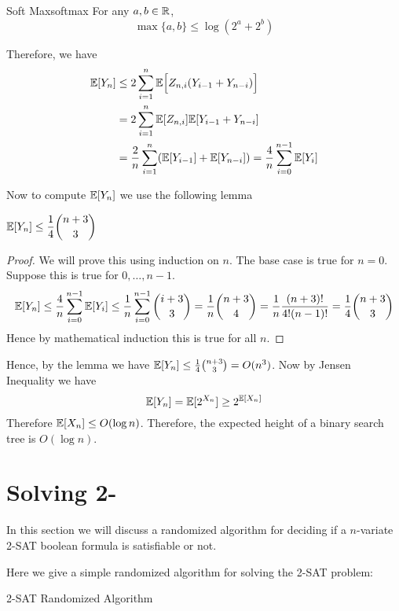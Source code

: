 \begin{lemma}{Soft Max}{softmax}
	For any $a,b\in \mathbb{R}$, $$\max\{a,b\}\leq \log (2^a+2^b)$$
\end{lemma}


Therefore, we have \begin{align*}
	\mathbb{E}[Y_n] & \leq 2\sum\limits_{i=1}^n\mathbb{E}\Big[Z_{n,i}(Y_{i-1}+ Y_{n-i})\Big]\\
	& = 2\sum\limits_{i=1}^n\mathbb{E}[Z_{n,i}]\mathbb{E}[Y_{i-1}+ Y_{n-i}]\\
	& = \frac2n\sum_{i=1}^n (\mathbb{E}[Y_{i-1}]+\mathbb{E}[Y_{n-i}])=\frac4n\sum_{i=0}^{n-1}\mathbb{E}[Y_i]
\end{align*}

Now to compute $\mathbb{E}[Y_n]$ we use the following lemma
\begin{lemma}{}{}
	$\displaystyle{\mathbb{E}[Y_n]\leq\frac14\binom{n+3}{3}}$
\end{lemma}
\begin{proof}
	We will prove this using induction on $n$. The base case is true for $n=0$. Suppose this is true for $0,\dots, n-1$. $$	\mathbb{E}[Y_n]\leq \frac4n\sum_{i=0}^{n-1}\mathbb{E}[Y_i]\leq \frac1n\sum_{i=0}^{n-1}\binom{i+3}{3}= \frac1n\binom{n+3}{4}= \frac1n\frac{(n+3)!}{4!(n-1)!}= \frac14\binom{n+3}{3}$$Hence by  mathematical induction  this is true for all $n$. 
\end{proof}

Hence, by the lemma we have $\mathbb{E}[Y_n]\leq\frac14\binom{n+3}{3}=O(n^3)$. Now by Jensen Inequality we have $$\mathbb{E}[Y_n]=\mathbb{E}[2^{X_n}]\geq 2^{\mathbb{E}[X_n]}$$Therefore $\mathbb{E}[X_n]\leq O(\log n)$. Therefore, the expected height of a binary search tree is $O(\log n)$. 
\section{Solving 2-}
In this section we will discuss a randomized algorithm for deciding if a $n$-variate 2-SAT boolean formula is satisfiable or not.

\begin{algoprob}
\end{algoprob}\parinf

Here we give a simple randomized algorithm for solving the 2-SAT problem:\parinn\newpage

\begin{algorithm}
\DontPrintSemicolon
{}
\caption{2-SAT Randomized Algorithm}
\end{algorithm}


